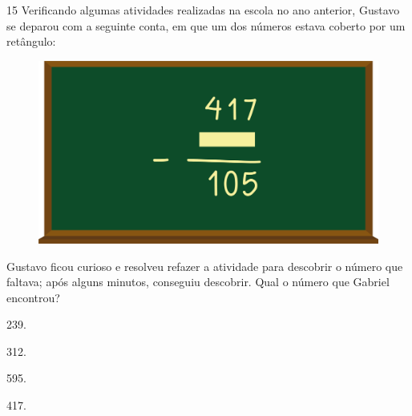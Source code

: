 \num{15} Verificando algumas atividades realizadas na escola no ano anterior, Gustavo se deparou com a seguinte conta, em que um dos números estava
coberto por um retângulo:

\begin{figure}[htpb!]
\centering  
\includegraphics[width=.5\textwidth]{./media/image122.png}
\end{figure}

Gustavo ficou curioso e resolveu refazer a atividade para descobrir o número que faltava; após alguns minutos, conseguiu descobrir. Qual o número que Gabriel encontrou?

\begin{multicols}{2}
\begin{escolha}
\item
  239.
\item
  312.
\item
  595.
\item
  417.
\end{escolha}
\end{multicols}



